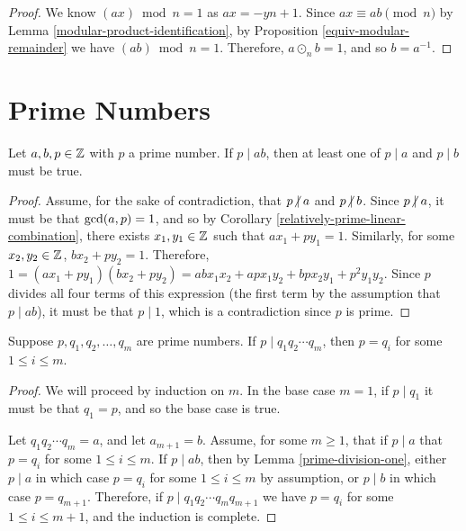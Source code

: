 \begin{proof}
    We know $(ax) \bmod n = 1$ as $ax = -yn + 1$. Since $ax \equiv ab \pmod n$ by Lemma \ref{modular-product-identification}, by Proposition \ref{equiv-modular-remainder} we have $(ab) \bmod n = 1$. Therefore, $a \odot_n b = 1$, and so $b = a^{-1}$.
\end{proof}

\section{Prime Numbers}

\begin{lemma}\label{prime-division-one}
    Let $a, b, p \in \mathbb{Z}$ with $p$ a prime number. If $p \mid ab$, then at least one of $p \mid a$ and $p \mid b$ must be true.
\end{lemma}

\begin{proof}
    Assume, for the sake of contradiction, that $p \centernot\mid a$ and $p \centernot\mid b$. Since $p \centernot\mid a$, it must be that $\operatorname{gcd}(a, p) = 1$, and so by Corollary \ref{relatively-prime-linear-combination}, there exists $x_1, y_1 \in \mathbb{Z}$ such that $ax_1 + py_1 = 1$. Similarly, for some $x_2, y_2 \in \mathbb{Z}$, $bx_2 + py_2 = 1$. Therefore, $1 = (ax_1 + py_1)(bx_2 + py_2) = abx_1x_2 + apx_1y_2 + bpx_2y_1 + p^2y_1y_2$. Since $p$ divides all four terms of this expression (the first term by the assumption that $p \mid ab$), it must be that $p \mid 1$, which is a contradiction since $p$ is prime.
\end{proof}

\begin{lemma}\label{prime-division-two}
    Suppose $p, q_1, q_2, \ldots, q_m$ are prime numbers. If $p \mid q_1q_2\cdots q_m$, then $p = q_i$ for some $1 \leq i \leq m$.
\end{lemma}

\begin{proof}
    We will proceed by induction on $m$. In the base case $m = 1$, if $p\mid q_1$ it must be that $q_1 = p$, and so the base case is true.

    Let $q_1q_2\cdots q_m = a$, and let $a_{m+1} = b$. Assume, for some $m \geq 1$, that if $p \mid a$ that $p = q_i$ for some $1 \leq i \leq m$. If $p \mid ab$, then by Lemma \ref{prime-division-one}, either $p \mid a$ in which case $p = q_i$ for some $1 \leq i \leq m$ by assumption, or  $p \mid b$ in which case $p = q_{m+1}$. Therefore, if $p \mid q_1q_2\cdots q_mq_{m+1}$ we have $p = q_i$ for some $1 \leq i \leq m+1$, and the induction is complete.
\end{proof}


